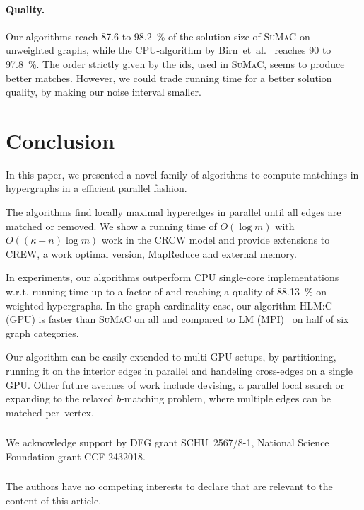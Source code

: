 \documentclass[runningheads]{llncs}
\newcommand{\algoFont}[1]{{\textsc{#1}}\xspace}
\newcommand{\competitorOUR}{\algoFont{HLM:C (GPU)}}
\newcommand{\competitorBIRN}{\algoFont{LM (MPI)}}
\newcommand{\competitorSUMAC}{\algoFont{SuMaC}}
\begin{document}
    \vspace{-0.2cm}
\paragraph{Quality.} Our algorithms reach 87.6 to 98.2~\% of the solution size of \competitorSUMAC on unweighted graphs, while the CPU-algorithm by Birn~et~al.~\cite{birn2013efficient} reaches 90 to 97.8~\%.
 The order strictly given by the ids, used in \competitorSUMAC, seems to produce better matches.
 However, we could trade running time for a better solution quality, by making our noise interval smaller.

    \vspace{-0.4cm}
\section{Conclusion}\label{sec:conclude}
    \vspace{-0.2cm}
In this paper, we presented a novel family of algorithms to compute matchings in hypergraphs in a efficient parallel fashion.

The algorithms find locally maximal hyperedges in parallel until all edges are matched or removed.
We show a running time of $O(\log{m})$ with~\hbox{$O((\kappa + n) \log{m})$} work in the CRCW model and provide extensions to CREW, a work optimal version, MapReduce and external memory.

In experiments, our algorithms outperform CPU single-core implementations w.r.t. running time up to a factor of  and reaching a quality of 88.13~\% on weighted hypergraphs. In the graph cardinality case, our algorithm \competitorOUR is faster than  \competitorSUMAC on all and compared to \competitorBIRN~\cite{birn2013efficient} on half of six graph categories. 

Our algorithm can be easily extended to multi-GPU setups, by partitioning, running it on the interior edges in parallel and handeling cross-edges on a single GPU.
Other future avenues of work include devising, a parallel local search or expanding to the relaxed $b$-matching problem, where multiple edges can be matched per~vertex.
\vspace{-0.3cm}
\begin{credits}
\footnotesize
\subsubsection{\ackname} We acknowledge support by DFG grant \hbox{SCHU 2567/8-1}, National Science Foundation grant \hbox{CCF-2432018}.
    \vspace{-0.4cm}
\subsubsection{\discintname}
 The authors have no competing interests to declare that are
relevant to the content of this article. 
\end{credits}
%
\vspace{-0.5cm}

\end{document}
